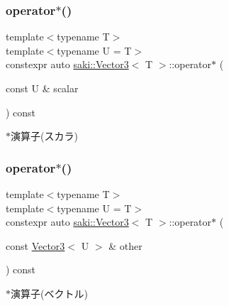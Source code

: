 \subsubsection{\texorpdfstring{operator$\ast$()}{operator*()}\hspace{0.1cm}{\footnotesize\ttfamily [1/2]}}
{\footnotesize\ttfamily template$<$typename T$>$ \\
template$<$typename U  = T$>$ \\
constexpr auto \mbox{\hyperlink{classsaki_1_1_vector3}{saki\+::\+Vector3}}$<$ T $>$\+::operator$\ast$ (\begin{DoxyParamCaption}\item[{const U \&}]{scalar }\end{DoxyParamCaption}) const\hspace{0.3cm}{\ttfamily [inline]}}



$\ast$演算子(スカラ) 

\mbox{\label{classsaki_1_1_vector3_adec0a13c42a1a0cb6af68622b649f8b5}} 
\subsubsection{\texorpdfstring{operator$\ast$()}{operator*()}\hspace{0.1cm}{\footnotesize\ttfamily [2/2]}}
{\footnotesize\ttfamily template$<$typename T$>$ \\
template$<$typename U  = T$>$ \\
constexpr auto \mbox{\hyperlink{classsaki_1_1_vector3}{saki\+::\+Vector3}}$<$ T $>$\+::operator$\ast$ (\begin{DoxyParamCaption}\item[{const \mbox{\hyperlink{classsaki_1_1_vector3}{Vector3}}$<$ U $>$ \&}]{other }\end{DoxyParamCaption}) const\hspace{0.3cm}{\ttfamily [inline]}}



$\ast$演算子(ベクトル) 

\mbox{\label{classsaki_1_1_vector3_abcfc63ddcaa8c7f148debedbe7fca788}} 
